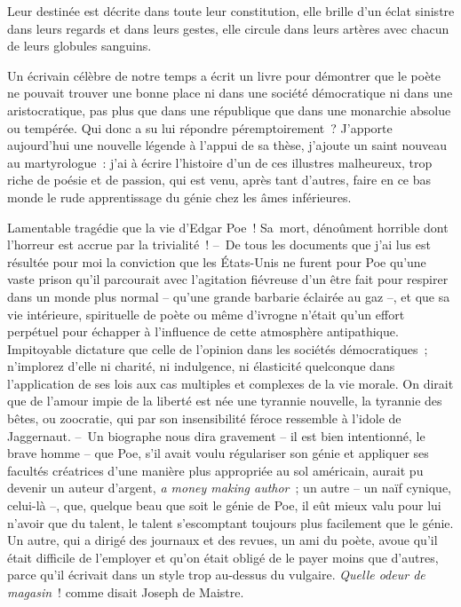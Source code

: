 \documentclass[french,twoside]{book} %
\begin{document}
\noindent Leur destinée est décrite dans toute leur constitution, elle brille d’un éclat sinistre dans leurs regards et dans leurs gestes, elle circule dans leurs artères avec chacun de leurs globules sanguins.\par
\hspace{1em}Un écrivain célèbre de notre temps a écrit un livre pour démontrer que le poète ne pouvait trouver une bonne place ni dans une société démocratique ni dans une aristocratique, pas plus que dans une république que dans une monarchie absolue ou tempérée. Qui donc a su lui répondre péremptoirement ? J’apporte aujourd’hui une nouvelle légende à l’appui de sa thèse, j’ajoute un saint nouveau au martyrologue : j’ai à écrire l’histoire d’un de ces illustres malheureux, trop riche de poésie et de passion, qui est venu, après tant d’autres, faire en ce bas monde le rude apprentissage du génie chez les âmes inférieures.\par
\hspace{1em}Lamentable tragédie que la vie d’Edgar Poe ! Sa mort, dénoûment horrible dont l’horreur est accrue par la trivialité ! – De tous les documents que j’ai lus est résultée pour moi la conviction que les États-Unis ne furent pour Poe qu’une vaste prison qu’il parcourait avec l’agitation fiévreuse d’un être fait pour respirer dans un monde plus normal – qu’une grande barbarie éclairée au gaz –, et que sa vie intérieure, spirituelle de poète ou même d’ivrogne n’était qu’un effort perpétuel pour échapper à l’influence de cette atmosphère antipathique. Impitoyable dictature que celle de l’opinion dans les sociétés démocratiques ; n’implorez d’elle ni charité, ni indulgence, ni élasticité quelconque dans l’application de ses lois aux cas multiples et complexes de la vie morale. On dirait que de l’amour impie de la liberté est née une tyrannie nouvelle, la tyrannie des bêtes, ou zoocratie, qui par son insensibilité féroce ressemble à l’idole de Jaggernaut. – Un biographe nous dira gravement – il est bien intentionné, le brave homme – que Poe, s’il avait voulu régulariser son génie et appliquer ses facultés créatrices d’une manière plus appropriée au sol américain, aurait pu devenir un auteur d’argent, \emph{a money making author} ; un autre – un naïf cynique, celui-là –, que, quelque beau que soit le génie de Poe, il eût mieux valu pour lui n’avoir que du talent, le talent s’escomptant toujours plus facilement que le génie. Un autre, qui a dirigé des journaux et des revues, un ami du poète, avoue qu’il était difficile de l’employer et qu’on était obligé de le payer moins que d’autres, parce qu’il écrivait dans un style trop au-dessus du vulgaire. \emph{Quelle odeur de magasin} ! comme disait Joseph de Maistre.\par
\end{document}
